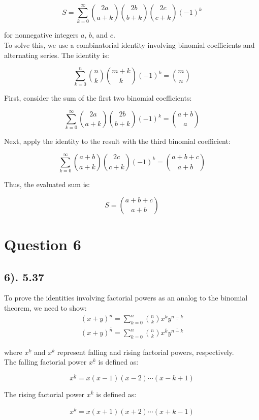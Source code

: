 \documentclass[12pt]{article}
\begin{document}
\[
S = \sum_{k=0}^{\infty} \binom{2a}{a+k} \binom{2b}{b+k} \binom{2c}{c+k} (-1)^k
\]

for nonnegative integers \(a\), \(b\), and \(c\). \\

To solve this, we use a combinatorial identity involving binomial coefficients and alternating series. The identity is:

\[
\sum_{k=0}^{n} \binom{n}{k} \binom{m+k}{k} (-1)^k = \binom{m}{n}
\]

First, consider the sum of the first two binomial coefficients:

\[
\sum_{k=0}^{\infty} \binom{2a}{a+k} \binom{2b}{b+k} (-1)^k = \binom{a+b}{a}
\]

Next, apply the identity to the result with the third binomial coefficient:

\[
\sum_{k=0}^{\infty} \binom{a+b}{a+k} \binom{2c}{c+k} (-1)^k = \binom{a+b+c}{a+b}
\]

Thus, the evaluated sum is:

\[
S = \binom{a+b+c}{a+b}
\]

\section*{Question 6}
\subsection*{6). 5.37}
To prove the identities involving factorial powers as an analog to the binomial theorem, we need to show:
\begin{gather*}
(x + y)^{\underline{n}} = \sum_{k=0}^{n} \binom{n}{k} x^{\underline{k}} y^{\underline{n-k}} \\
(x + y)^{\overline{n}} = \sum_{k=0}^{n} \binom{n}{k} x^{\overline{k}} y^{\overline{n-k}}
\end{gather*}

where \(x^{\underline{k}}\) and \(x^{\overline{k}}\) represent falling and rising factorial powers, respectively. \\

The falling factorial power \(x^{\underline{k}}\) is defined as:

\[ x^{\underline{k}} = x (x - 1) (x - 2) \cdots (x - k + 1) \]

The rising factorial power \(x^{\overline{k}}\) is defined as:

\[ x^{\overline{k}} = x (x + 1) (x + 2) \cdots (x + k - 1) \]
\end{document}
